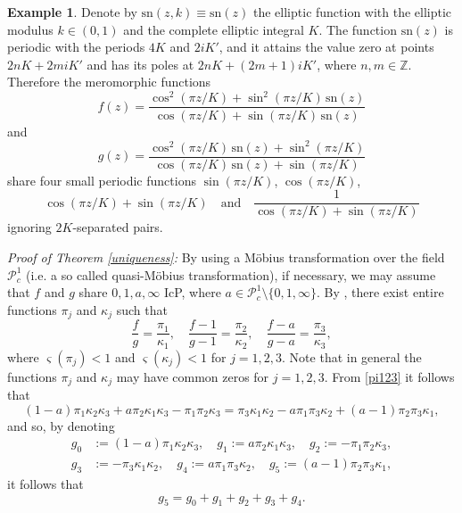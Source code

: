 \documentclass{amsart}
\newcommand{\Z}{\mathbb{Z}}
\newcommand{\sn}{\textrm{sn}}
\theoremstyle{definition}
\newtheorem{example}[theorem]{Example}
\numberwithin{equation}{section}
\numberwithin{theorem}{section}
\begin{document}
\begin{example}
Denote by $\textrm{sn}(z,k)\equiv\textrm{sn}(z)$ the elliptic
function with the elliptic modulus $k\in(0,1)$ and the complete
elliptic integral $K$. The function $\textrm{sn}(z)$ is periodic
with the periods $4K$ and $2iK'$, and it attains the value zero at
points $2nK+2miK'$ and has its poles at $2nK+(2m+1)iK'$, where
$n,m\in\Z$. Therefore the meromorphic functions
    \begin{equation*}
    f(z)=\frac{\cos^2 (\pi z/K) +\sin^2 (\pi z/K)\, \sn(z)}{\cos
    (\pi z/K) +\sin (\pi z/K)\, \sn (z)}
    \end{equation*}
and
    \begin{equation*}
    g(z)=\frac{\cos^2 (\pi
    z/K)\, \sn (z) +  \sin^2 (\pi z/K) }{\cos (\pi z/K)\, \sn (z)
    +\sin (\pi z/K)}
    \end{equation*}
share four small periodic functions $\sin (\pi z/K)$, $\cos (\pi
z/K)$,
$$
\cos (\pi z/K) + \sin (\pi z/K) \quad \mbox{and} \quad
\frac{1}{\cos (\pi z/K) + \sin (\pi z/K)}
$$
ignoring $2K$-separated pairs.
\end{example}

\noindent\textit{Proof of Theorem \ref{uniqueness}: } By using a M\"obius
transformation over the field $\mathcal{P}_c^1$ (i.e. a so called quasi-M\"obius
transformation), if necessary, we may assume that $f$ and $g$
share $0,1,a,\infty$ IcP, where
$a\in\mathcal{P}_c^1\setminus\{0,1,\infty\}$. By \cite[Theorem 1]{miles:72}, there exist entire functions $\pi_j$ and $\kappa_j$ such that
    \begin{equation}\label{pi123}
    \frac{f}{g}=\frac{\pi_1}{\kappa_1},\quad
    \frac{f-1}{g-1}=\frac{\pi_2}{\kappa_2},\quad\frac{f-a}{g-a}=\frac{\pi_3}{\kappa_3},
    \end{equation}
where $\varsigma(\pi_j)<1$ and $\varsigma(\kappa_j)<1$ for $j=1,2,3$. Note that in general the functions $\pi_j$ and $\kappa_j$ may have common zeros for $j=1,2,3$. From \eqref{pi123} it follows that
    \begin{equation}\label{pieq}
    (1-a)\pi_1\kappa_2\kappa_3 +a\pi_2\kappa_1\kappa_3 -
    \pi_1\pi_2\kappa_3=\pi_3\kappa_1\kappa_2
    -a\pi_1\pi_3\kappa_2+(a-1)\pi_2\pi_3\kappa_1,
    \end{equation}
and so, by denoting
    \begin{equation}\label{gs}
    \begin{split}
    g_0&:=(1-a)\pi_1\kappa_2\kappa_3, \quad
    g_1:=a\pi_2\kappa_1\kappa_3,\quad
    g_2:= - \pi_1\pi_2\kappa_3, \\
    g_3&:=-\pi_3\kappa_1\kappa_2, \quad
    g_4:=a\pi_1\pi_3\kappa_2, \quad
    g_5:=(a-1)\pi_2\pi_3\kappa_1,
    \end{split}
    \end{equation}
it follows that
    \begin{equation}\label{g6}
    g_5=g_0+g_1+g_2+g_3+g_4.
    \end{equation}
\end{document}

